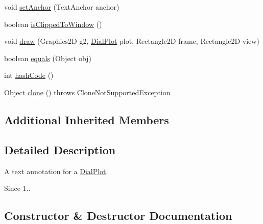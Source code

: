 \begin{DoxyCompactItemize}
\item 
void \mbox{\hyperlink{classorg_1_1jfree_1_1chart_1_1plot_1_1dial_1_1_dial_text_annotation_adb70dd46a09f66cba42bca86d1c59f0a}{set\+Anchor}} (Text\+Anchor anchor)
\item 
boolean \mbox{\hyperlink{classorg_1_1jfree_1_1chart_1_1plot_1_1dial_1_1_dial_text_annotation_a341292864b0a591544a890548e4d68d5}{is\+Clipped\+To\+Window}} ()
\item 
void \mbox{\hyperlink{classorg_1_1jfree_1_1chart_1_1plot_1_1dial_1_1_dial_text_annotation_af3ff14430a6e7be514a21dbccc1ef7bc}{draw}} (Graphics2D g2, \mbox{\hyperlink{classorg_1_1jfree_1_1chart_1_1plot_1_1dial_1_1_dial_plot}{Dial\+Plot}} plot, Rectangle2D frame, Rectangle2D view)
\item 
boolean \mbox{\hyperlink{classorg_1_1jfree_1_1chart_1_1plot_1_1dial_1_1_dial_text_annotation_a01af30f8589383698267e3ece7ab26d1}{equals}} (Object obj)
\item 
int \mbox{\hyperlink{classorg_1_1jfree_1_1chart_1_1plot_1_1dial_1_1_dial_text_annotation_a546b56589ad85c21e981c8f4582b73dd}{hash\+Code}} ()
\item 
Object \mbox{\hyperlink{classorg_1_1jfree_1_1chart_1_1plot_1_1dial_1_1_dial_text_annotation_ac710cc973493379cdb15957f0a408a3a}{clone}} ()  throws Clone\+Not\+Supported\+Exception 
\end{DoxyCompactItemize}
\subsection*{Additional Inherited Members}


\subsection{Detailed Description}
A text annotation for a \mbox{\hyperlink{classorg_1_1jfree_1_1chart_1_1plot_1_1dial_1_1_dial_plot}{Dial\+Plot}}.

\begin{DoxySince}{Since}
1.. 
\end{DoxySince}


\subsection{Constructor \& Destructor Documentation}
\mbox{\label{classorg_1_1jfree_1_1chart_1_1plot_1_1dial_1_1_dial_text_annotation_ad5d9d0316a3bd184d20c2d93d6b0e045}} 
